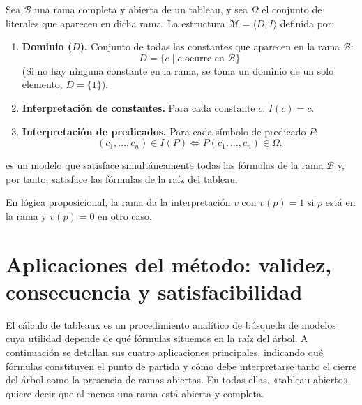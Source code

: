 \begin{theorem}
Sea $\mathcal{B}$ una rama completa y abierta de un tableau, y sea $\Omega$ el conjunto de literales que aparecen en dicha rama. La estructura $\mathcal{M} = \langle D, I \rangle$ definida por:
\begin{enumerate}
    \item \textbf{Dominio ($D$).} Conjunto de todas las constantes que aparecen en la rama $\mathcal{B}$:
    \[
    D = \{c \mid c \text{ ocurre en } \mathcal{B}\}
    \]
    (Si no hay ninguna constante en la rama, se toma un dominio de un solo elemento, $D = \{1\}$).
    \item \textbf{Interpretación de constantes.} Para cada constante
      $c$, $I(c) = c$.
    \item \textbf{Interpretación de predicados.} Para cada símbolo de predicado $P$:
    \[
    (c_1, \dots, c_n) \in I(P) \iff P(c_1, \dots, c_n) \in \Omega.
    \]
\end{enumerate}
es un modelo que satisface simultáneamente todas las fórmulas de la rama $\mathcal{B}$ y, por tanto, satisface las fórmulas de la raíz del tableau.
\end{theorem}

\noindent En lógica proposicional, la rama da la interpretación $v$ con $v(p) = 1$ si $p$ está en la rama y $v(p) = 0$ en otro caso.

\section{Aplicaciones del método: validez, consecuencia y satisfacibilidad}

El cálculo de tableaux es un procedimiento analítico de búsqueda de modelos
cuya utilidad depende de qué fórmulas situemos en la raíz del árbol. A
continuación se detallan sus cuatro aplicaciones
principales, indicando qué fórmulas constituyen el punto de partida
y cómo debe interpretarse tanto el cierre del árbol como la presencia
de ramas abiertas. En todas ellas, «tableau abierto» quiere decir que
al menos una rama está abierta y completa.

